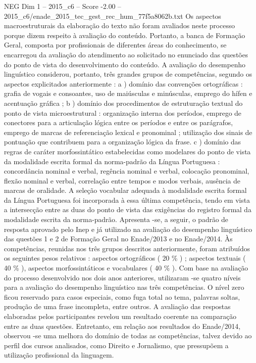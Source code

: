 \begin{textsample}{NEG Dim 1 – 2015\_c6 – Score -2.00 – 2015\_c6/enade\_2015\_tec\_gest\_rec\_hum\_77f5a8062b.txt}
Os aspectos macroestruturais da elaboração do texto não foram avaliados neste processo porque dizem respeito à avaliação do conteúdo.
Portanto, a banca de Formação Geral, composta por profissionais de diferentes áreas do conhecimento, se encarregou da avaliação do atendimento ao solicitado no enunciado das questões do ponto de vista do desenvolvimento do conteúdo.
A avaliação do desempenho linguístico considerou, portanto, três grandes grupos de competências, segundo os aspectos explicitados anteriormente : a ) domínio das convenções ortográficas : grafia de vogais e consoantes, uso de maiúsculas e minúsculas, emprego do hífen e acentuação gráfica ; b ) domínio dos procedimentos de estruturação textual do ponto de vista microestrutural : organização interna dos períodos, emprego de conectores para a articulação lógica entre os períodos e entre os parágrafos, emprego de marcas de referenciação lexical e pronominal ; utilização dos sinais de pontuação que contribuem para a organização lógica da frase. c ) domínio das regras de caráter morfossintático estabelecidas como modelares do ponto de vista da modalidade escrita formal da norma-padrão da Língua Portuguesa : concordância nominal e verbal, regência nominal e verbal, colocação pronominal, flexão nominal e verbal, correlação entre tempos e modos verbais, ausência de marcas de oralidade.
A seleção vocabular adequada à modalidade escrita formal da Língua Portuguesa foi incorporada à essa última competência, tendo em vista a intersecção entre as duas do ponto de vista das exigências do registro formal da modalidade escrita da norma-padrão.
Apresenta -se, a seguir, o padrão de resposta aprovado pelo Inep e já utilizado na avaliação do desempenho linguístico das questões 1 e 2 de Formação Geral no Enade/2013 e no Enade/2014.
Às competências, reunidas nos três grupos descritos anteriormente, foram atribuídos os seguintes pesos relativos : aspectos ortográficos ( 20 \% ) ; aspectos textuais ( 40 \% ), aspectos morfossintáticos e vocabulares ( 40 \% ).
Com base na avaliação do processo desenvolvido nos dois anos anteriores, utilizaram -se quatro níveis para a avaliação do desempenho linguístico nas três competências.
O nível zero ficou reservado para casos especiais, como fuga total ao tema, palavras soltas, produção de uma frase incompleta, entre outros.
A avaliação das respostas elaboradas pelos participantes revelou um resultado coerente na comparação entre as duas questões.
Entretanto, em relação aos resultados do Enade/2014, observou -se uma melhora do domínio de todas as competências, talvez devido ao perfil dos cursos analisados, como Direito e Jornalismo, que pressupõem a utilização profissional da linguagem.

\end{textsample}
